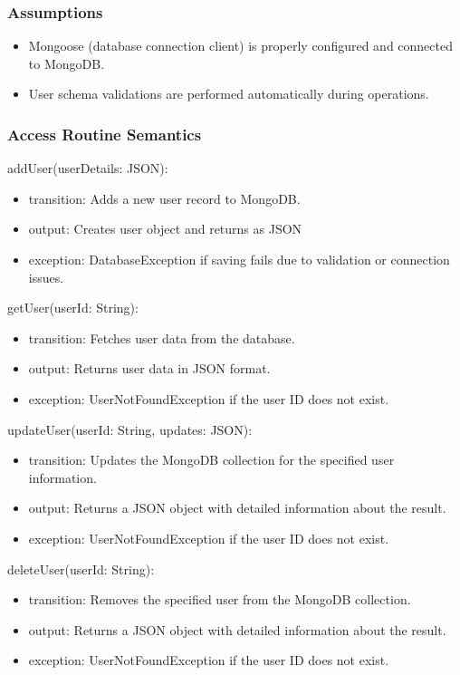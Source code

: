 \documentclass[12pt, titlepage]{article}
\begin{document}
\subsubsection{Assumptions}
\begin{itemize}
  \item Mongoose (database connection client) is properly configured and connected to MongoDB.
  \item User schema validations are performed automatically during operations.
\end{itemize}

\subsubsection{Access Routine Semantics}

\noindent addUser(userDetails: JSON):
\begin{itemize}
  \item transition: Adds a new user record to MongoDB.
  \item output: Creates user object and returns as JSON
  \item exception: DatabaseException if saving fails due to validation or connection issues.
\end{itemize}

\noindent getUser(userId: String):
\begin{itemize}
  \item transition: Fetches user data from the database.
  \item output: Returns user data in JSON format.
  \item exception: UserNotFoundException if the user ID does not exist.
\end{itemize}

\noindent updateUser(userId: String, updates: JSON):
\begin{itemize}
  \item transition: Updates the MongoDB collection for the specified user information.
  \item output: Returns a JSON object with detailed information about the result.
  \item exception: UserNotFoundException if the user ID does not exist.
\end{itemize}

\noindent deleteUser(userId: String):
\begin{itemize}
  \item transition: Removes the specified user from the MongoDB collection.
  \item output: Returns a JSON object with detailed information about the result.
  \item exception: UserNotFoundException if the user ID does not exist.
\end{itemize}
\end{document}
